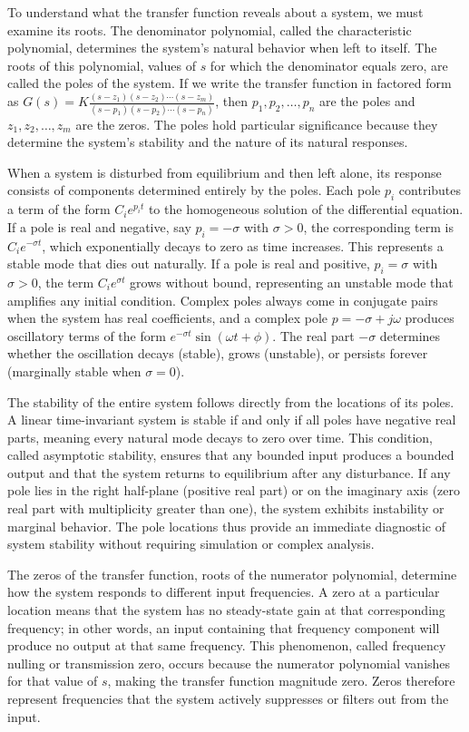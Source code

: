 To understand what the transfer function reveals about a system, we must examine its roots. The denominator polynomial, called the characteristic polynomial, determines the system's natural behavior when left to itself. The roots of this polynomial, values of $s$ for which the denominator equals zero, are called the poles of the system. If we write the transfer function in factored form as $G(s) = K \frac{(s-z_1)(s-z_2)\cdots(s-z_m)}{(s-p_1)(s-p_2)\cdots(s-p_n)}$, then $p_1, p_2, \ldots, p_n$ are the poles and $z_1, z_2, \ldots, z_m$ are the zeros. The poles hold particular significance because they determine the system's stability and the nature of its natural responses.

When a system is disturbed from equilibrium and then left alone, its response consists of components determined entirely by the poles. Each pole $p_i$ contributes a term of the form $C_i e^{p_i t}$ to the homogeneous solution of the differential equation. If a pole is real and negative, say $p_i = -\sigma$ with $\sigma > 0$, the corresponding term is $C_i e^{-\sigma t}$, which exponentially decays to zero as time increases. This represents a stable mode that dies out naturally. If a pole is real and positive, $p_i = \sigma$ with $\sigma > 0$, the term $C_i e^{\sigma t}$ grows without bound, representing an unstable mode that amplifies any initial condition. Complex poles always come in conjugate pairs when the system has real coefficients, and a complex pole $p = -\sigma + j\omega$ produces oscillatory terms of the form $e^{-\sigma t} \sin(\omega t + \phi)$. The real part $-\sigma$ determines whether the oscillation decays (stable), grows (unstable), or persists forever (marginally stable when $\sigma = 0$).

The stability of the entire system follows directly from the locations of its poles. A linear time-invariant system is stable if and only if all poles have negative real parts, meaning every natural mode decays to zero over time. This condition, called asymptotic stability, ensures that any bounded input produces a bounded output and that the system returns to equilibrium after any disturbance. If any pole lies in the right half-plane (positive real part) or on the imaginary axis (zero real part with multiplicity greater than one), the system exhibits instability or marginal behavior. The pole locations thus provide an immediate diagnostic of system stability without requiring simulation or complex analysis.

The zeros of the transfer function, roots of the numerator polynomial, determine how the system responds to different input frequencies. A zero at a particular location means that the system has no steady-state gain at that corresponding frequency; in other words, an input containing that frequency component will produce no output at that same frequency. This phenomenon, called frequency nulling or transmission zero, occurs because the numerator polynomial vanishes for that value of $s$, making the transfer function magnitude zero. Zeros therefore represent frequencies that the system actively suppresses or filters out from the input.

